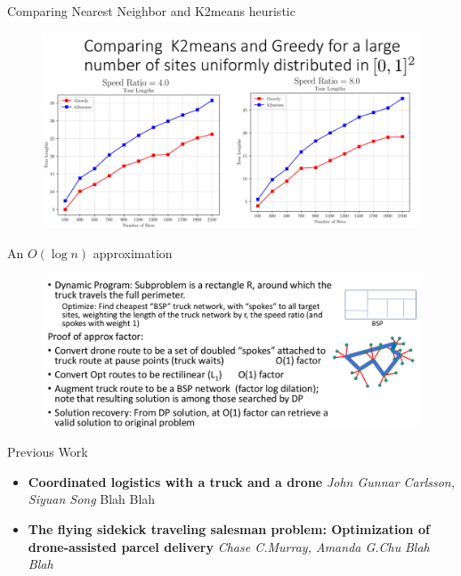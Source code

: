 \documentclass{beamer}
\begin{document}
\begin{frame}[t]{Comparing Nearest Neighbor and K2means heuristic}
  \vspace{-20pt}
  \begin{figure}
    \centering
     \includegraphics[width=12cm]{slide_imgs/compare_k2means_greedy.png}
   \end{figure}
\end{frame}



\begin{frame}{An $O(\log n)$ approximation}

  \begin{figure}
        \includegraphics[width=11.5cm]{slide_imgs/logn_approx.png}
  \end{figure}

\end{frame}

\begin{frame}{Previous Work}
    \begin{itemize}
       \item \textbf{Coordinated logistics with a truck and a drone} \newline\textit{John Gunnar Carlsson, Siyuan Song} \newline Blah Blah
       \item \textbf{The flying sidekick traveling salesman problem: Optimization of drone-assisted parcel delivery} \newline \textit{Chase C.Murray, Amanda G.Chu} \newline \textit{Blah Blah}
    \end{itemize}
\end{frame}
\end{document}
